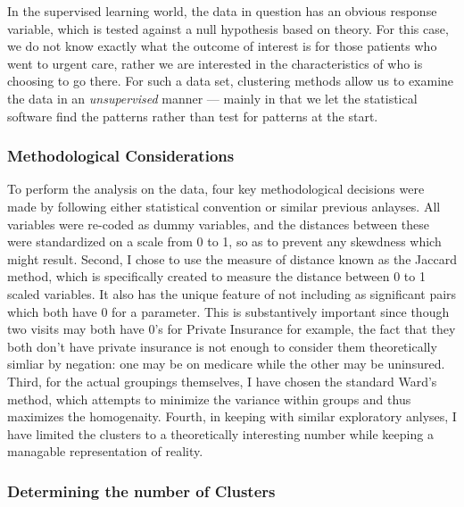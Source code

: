 \documentclass[12pt,twoside]{reedthesis}
\begin{document}
  In the supervised learning world, the data in question has an obvious
  response variable, which is tested against a null hypothesis based on
  theory. For this case, we do not know exactly what the outcome of
  interest is for those patients who went to urgent care, rather we are
  interested in the characteristics of who is choosing to go there. For
  such a data set, clustering methods allow us to examine the data in an
  \emph{unsupervised} manner --- mainly in that we let the statistical
  software find the patterns rather than test for patterns at the start.
  
  \subsubsection*{Methodological
  Considerations}\label{methodological-considerations}
  
  To perform the analysis on the data, four key methodological decisions
  were made by following either statistical convention or similar previous
  anlayses. All variables were re-coded as dummy variables, and the
  distances between these were standardized on a scale from 0 to 1, so as
  to prevent any skewdness which might result. Second, I chose to use the
  measure of distance known as the Jaccard method, which is specifically
  created to measure the distance between 0 to 1 scaled variables. It also
  has the unique feature of not including as significant pairs which both
  have 0 for a parameter. This is substantively important since though two
  visits may both have 0's for Private Insurance for example, the fact
  that they both don't have private insurance is not enough to consider
  them theoretically simliar by negation: one may be on medicare while the
  other may be uninsured. Third, for the actual groupings themselves, I
  have chosen the standard Ward's method, which attempts to minimize the
  variance within groups and thus maximizes the homogenaity. Fourth, in
  keeping with similar exploratory anlyses, I have limited the clusters to
  a theoretically interesting number while keeping a managable
  representation of reality.
  
  \subsubsection*{Determining the number of
  Clusters}\label{determining-the-number-of-clusters}
  
\end{document}
